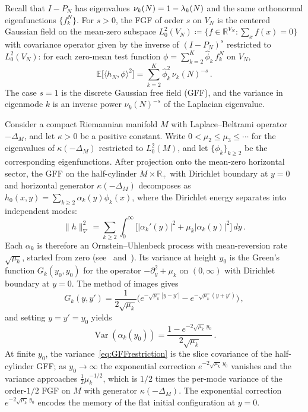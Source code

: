 \documentclass[11pt,a4paper,reqno]{amsart}
\theoremstyle{definition}
\newcommand{\bbE}{{\ensuremath{\mathbb E}} }
\newcommand{\bbR}{{\ensuremath{\mathbb R}} }
\newcommand{\var}{\operatorname{Var}}
\let\a=\alpha \let\b=\beta   \let\d=\delta  \let\e=\varepsilon
\let\m=\mu   \let\n=\nu   \let\o=\omega    \let\p=\pi  \let\ph=\varphi
\newcommand{\de}{\partial}
\begin{document}
Recall that $I - P_N$ has eigenvalues $\n_k(N) = 1 - \l_k(N)$ and the same orthonormal eigenfunctions $\{f_k^N\}$.
For $s > 0$, the FGF of order $s$ on $V_N$ is the centered Gaussian field on the mean-zero subspace $L^2_0(V_N) \coloneqq \{f \in \bbR^{V_N} : \sum_{x} f(x) = 0\}$ with covariance operator given by the inverse of $(I - P_N)^s$ restricted to $L^2_0(V_N)$: for each zero-mean test function $\phi = \sum_{k=2}^K \widehat\phi_k \, f_k^N$ on $V_N$,
	\begin{equation}\label{eq:FGFvar}
	 \bbE \big[ \langle h_N , \phi \rangle^2 \big]
	= \sum_{k=2}^K \widehat\phi_k^2 \, \n_k(N)^{-s}\,.
	\end{equation}
The case $s = 1$ is the discrete Gaussian free field (GFF), and the variance in eigenmode $k$ is an inverse power $\n_k(N)^{-s}$ of the Laplacian eigenvalue.

Consider a compact Riemannian manifold $M$ with Laplace--Beltrami operator $-\Delta_M$, and let $\kappa > 0$ be a positive constant. Write $0 < \m_2 \leq \m_3 \leq \cdots$ for the eigenvalues of $\kappa(-\Delta_M)$ restricted to $L^2_0(M)$, and let $\{\phi_k\}_{k\geq 2}$ be the corresponding eigenfunctions. After projection onto the mean-zero horizontal sector, the GFF on the half-cylinder $M \times \bbR_+$ with Dirichlet boundary at $y = 0$ and horizontal generator $\kappa(-\Delta_M)$ decomposes as $h_0(x, y) = \sum_{k\geq 2} \a_k(y)\phi_k(x)$, where the Dirichlet energy separates into independent modes:
	\[ \|h\|_\nabla^2 = \sum_{k\geq 2} \int_0^\infty \big[ |\a_k'(y)|^2 + \m_k |\a_k(y)|^2 \big]\, dy\,. \]
Each $\a_k$ is therefore an Ornstein--Uhlenbeck process with mean-reversion rate $\sqrt{\m_k}$, started from zero (see~\cite{sheffield2007gaussian} and~\cite{jerison2014internal2}). Its variance at height $y_0$ is the Green's function $G_k(y_0, y_0)$ for the operator $-\de_y^2 + \m_k$ on $(0, \infty)$ with Dirichlet boundary at $y = 0$. The method of images gives
	\[ G_k(y, y') = \frac{1}{2\sqrt{\m_k}} \Big( e^{-\sqrt{\m_k}\, |y - y'|} - e^{-\sqrt{\m_k}(y + y')} \Big)\,, \]
and setting $y = y' = y_0$ yields
	\begin{equation}\label{eq:GFFrestriction}
	 \var(\a_k(y_0)) = \frac{1 - e^{-2\sqrt{\m_k}\, y_0}}{2\sqrt{\m_k}}\,.
	\end{equation}
At finite $y_0$, the variance~\eqref{eq:GFFrestriction} is the slice covariance of the half-cylinder GFF; as $y_0 \to \infty$ the exponential correction $e^{-2\sqrt{\m_k}\,y_0}$ vanishes and the variance approaches $\tfrac{1}{2}\m_k^{-1/2}$, which is $1/2$ times the per-mode variance of the order-$1/2$ FGF on $M$ with generator $\kappa(-\Delta_M)$.  The exponential correction $e^{-2\sqrt{\m_k}\,y_0}$ encodes the memory of the flat initial configuration at $y = 0$.
\end{document}
